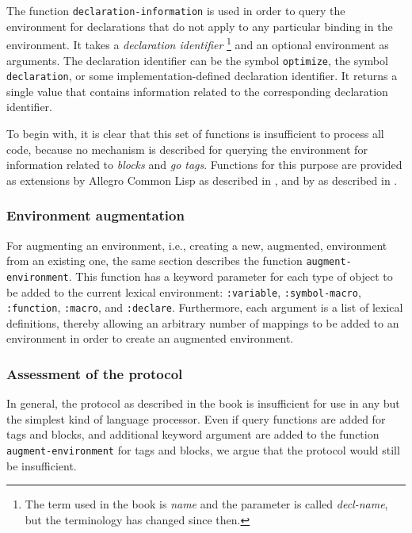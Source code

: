 The function \texttt{declaration-information} is used in order to
query the environment for declarations that do not apply to any
particular binding in the environment.  It takes a \emph{declaration
  identifier}%
\footnote{The term used in the book is \emph{name} and the parameter
  is called \textit{decl-name}, but the terminology has changed since
  then.} 
and an optional environment as arguments.  The declaration identifier
can be the symbol \texttt{optimize}, the symbol \texttt{declaration},
or some implementation-defined declaration identifier.  It returns a
single value that contains information related to the corresponding
declaration identifier.

To begin with, it is clear that this set of functions is insufficient
to process all \commonlisp{} code, because no mechanism is described
for querying the environment for information related to \emph{blocks}
and \emph{go tags}.  Functions for this purpose are provided as
extensions by Allegro Common Lisp as described in
, and by \lispworks{} as described in
.

\subsubsection{Environment augmentation}

For augmenting an environment, i.e., creating a new, augmented,
environment from an existing one, the same section describes the
function \texttt{augment-environment}.  This function has a keyword
parameter for each type of object to be added to the current lexical
environment: \texttt{:variable}, \texttt{:symbol-macro},
\texttt{:function}, \texttt{:macro}, and \texttt{:declare}.
Furthermore, each argument is a list of lexical definitions, thereby
allowing an arbitrary number of mappings to be added to an environment
in order to create an augmented environment.

\subsubsection{Assessment of the protocol}

In general, the protocol as described in the book is insufficient for
use in any but the simplest kind of language processor.  Even if query
functions are added for tags and blocks, and additional keyword
argument are added to the function \texttt{augment-environment} for
tags and blocks, we argue that the protocol would still be
insufficient.

